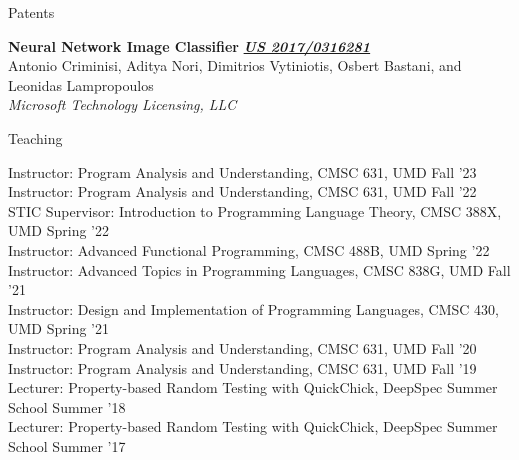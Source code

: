 \documentclass{resume} %
\begin{document}
\begin{rSection}{Patents}

{\bf Neural Network Image Classifier} \hfill {\href{https://patentimages.storage.googleapis.com/44/ec/9f/3f90c94a602fda/US20170316281A1.pdf}{\bf \em US 2017/0316281}}\\
Antonio Criminisi, Aditya Nori, Dimitrios Vytiniotis, Osbert Bastani, and Leonidas Lampropoulos\\
{\em Microsoft Technology Licensing, LLC}

  
\end{rSection}


\newcommand{\teach}[3]{
  {#1: #2} \hfill #3 \\
  }

\begin{rSection}{Teaching}

  \teach{Instructor}{Program Analysis and Understanding, CMSC 631, UMD}{Fall '23}    
  \teach{Instructor}{Program Analysis and Understanding, CMSC 631, UMD}{Fall '22}  
  \teach{STIC Supervisor}{Introduction to Programming Language Theory, CMSC 388X, UMD}{Spring '22}  
  \teach{Instructor}{Advanced Functional Programming, CMSC 488B, UMD}{Spring '22}  
  \teach{Instructor}{Advanced Topics in Programming Languages, CMSC 838G, UMD}{Fall '21}
  \teach{Instructor}{Design and Implementation of Programming Languages, CMSC 430, UMD}{Spring '21}  
  \teach{Instructor}{Program Analysis and Understanding, CMSC 631, UMD}{Fall '20}
  \teach{Instructor}{Program Analysis and Understanding, CMSC 631, UMD}{Fall '19}
  \teach{Lecturer}{Property-based Random Testing with QuickChick, DeepSpec Summer School}{Summer '18}
  \teach{Lecturer}{Property-based Random Testing with QuickChick, DeepSpec Summer School}{Summer '17}  
\end{rSection}



\newcommand{\talk}[3]{
  {\bf #1} \\ %
  {#3}
  }
\end{document}
